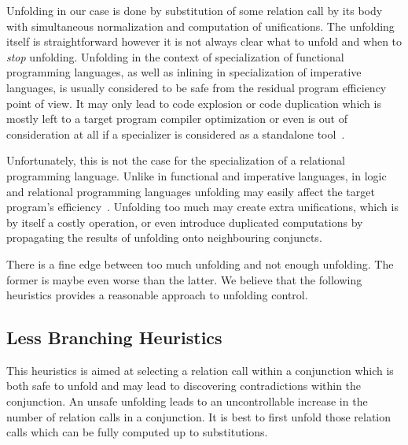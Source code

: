 Unfolding in our case is done by substitution of some relation call by its body with simultaneous normalization and computation of unifications.
The unfolding itself is straightforward however it is not always clear what to unfold and when to \emph{stop} unfolding.
Unfolding in the context of specialization of functional programming languages, as well as inlining in specialization of imperative languages, is usually considered to be safe from the residual program efficiency point of view.
It may only lead to code explosion or code duplication which is mostly left to a target program compiler optimization or even is out of consideration at all if a specializer is considered as a standalone tool~\cite{jonesbook}.

Unfortunately, this is not the case for the specialization of a relational programming language.
Unlike in functional and imperative languages, in logic and relational programming languages unfolding may easily affect the target program's efficiency~\cite{leuschel2002logic}.
Unfolding too much may create extra unifications, which is by itself a costly operation, or even introduce duplicated computations by propagating the results of unfolding onto neighbouring conjuncts.

There is a fine edge between too much unfolding and not enough unfolding.
The former is maybe even worse than the latter.
We believe that the following heuristics provides a reasonable approach to unfolding control.

\subsection{Less Branching Heuristics}
\label{sec:heurictic}

This heuristics is aimed at selecting a relation call within a conjunction which is both safe to unfold and may lead to discovering contradictions within the conjunction.
An unsafe unfolding leads to an uncontrollable increase in the number of relation calls in a conjunction.
It is best to first unfold those relation calls which can be fully computed up to substitutions.


